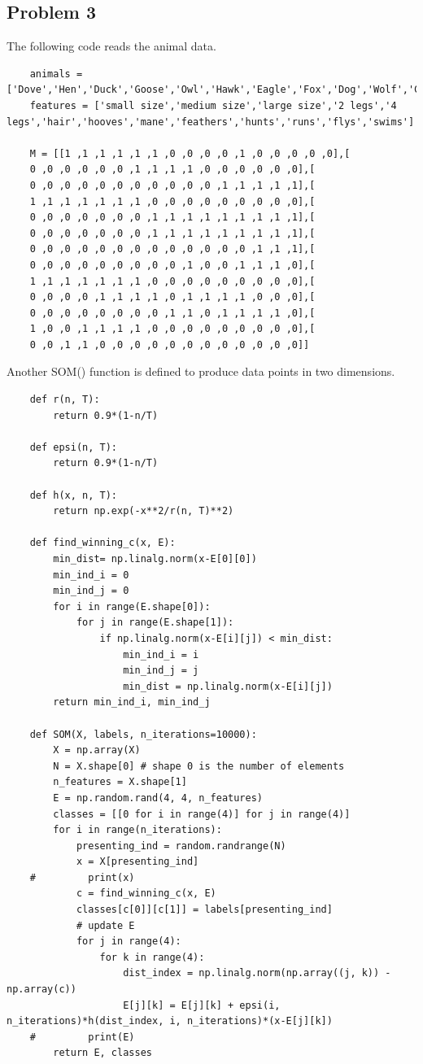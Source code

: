 \documentclass{article}
\begin{document}
\subsection*{Problem 3}
The following code reads the animal data. 
\begin{lstlisting}
	animals = ['Dove','Hen','Duck','Goose','Owl','Hawk','Eagle','Fox','Dog','Wolf','Cat','Tiger','Lion','Horse','Zebra','Cow']
	features = ['small size','medium size','large size','2 legs','4 legs','hair','hooves','mane','feathers','hunts','runs','flys','swims']

	M = [[1 ,1 ,1 ,1 ,1 ,1 ,0 ,0 ,0 ,0 ,1 ,0 ,0 ,0 ,0 ,0],[
	0 ,0 ,0 ,0 ,0 ,0 ,1 ,1 ,1 ,1 ,0 ,0 ,0 ,0 ,0 ,0],[
	0 ,0 ,0 ,0 ,0 ,0 ,0 ,0 ,0 ,0 ,0 ,1 ,1 ,1 ,1 ,1],[
	1 ,1 ,1 ,1 ,1 ,1 ,1 ,0 ,0 ,0 ,0 ,0 ,0 ,0 ,0 ,0],[
	0 ,0 ,0 ,0 ,0 ,0 ,0 ,1 ,1 ,1 ,1 ,1 ,1 ,1 ,1 ,1],[
	0 ,0 ,0 ,0 ,0 ,0 ,0 ,1 ,1 ,1 ,1 ,1 ,1 ,1 ,1 ,1],[
	0 ,0 ,0 ,0 ,0 ,0 ,0 ,0 ,0 ,0 ,0 ,0 ,0 ,1 ,1 ,1],[
	0 ,0 ,0 ,0 ,0 ,0 ,0 ,0 ,0 ,1 ,0 ,0 ,1 ,1 ,1 ,0],[
	1 ,1 ,1 ,1 ,1 ,1 ,1 ,0 ,0 ,0 ,0 ,0 ,0 ,0 ,0 ,0],[
	0 ,0 ,0 ,0 ,1 ,1 ,1 ,1 ,0 ,1 ,1 ,1 ,1 ,0 ,0 ,0],[
	0 ,0 ,0 ,0 ,0 ,0 ,0 ,0 ,1 ,1 ,0 ,1 ,1 ,1 ,1 ,0],[
	1 ,0 ,0 ,1 ,1 ,1 ,1 ,0 ,0 ,0 ,0 ,0 ,0 ,0 ,0 ,0],[
	0 ,0 ,1 ,1 ,0 ,0 ,0 ,0 ,0 ,0 ,0 ,0 ,0 ,0 ,0 ,0]]
\end{lstlisting}
Another SOM() function is defined to produce data points in two dimensions. 
\begin{lstlisting}
	def r(n, T):
		return 0.9*(1-n/T)
		
	def epsi(n, T):
		return 0.9*(1-n/T)

	def h(x, n, T):
		return np.exp(-x**2/r(n, T)**2)

	def find_winning_c(x, E):
		min_dist= np.linalg.norm(x-E[0][0])
		min_ind_i = 0
		min_ind_j = 0
		for i in range(E.shape[0]):
			for j in range(E.shape[1]):
				if np.linalg.norm(x-E[i][j]) < min_dist:
					min_ind_i = i
					min_ind_j = j
					min_dist = np.linalg.norm(x-E[i][j])
		return min_ind_i, min_ind_j

	def SOM(X, labels, n_iterations=10000):
		X = np.array(X)
		N = X.shape[0] # shape 0 is the number of elements
		n_features = X.shape[1]
		E = np.random.rand(4, 4, n_features)
		classes = [[0 for i in range(4)] for j in range(4)]
		for i in range(n_iterations):
			presenting_ind = random.randrange(N)
			x = X[presenting_ind]
	#         print(x)
			c = find_winning_c(x, E)
			classes[c[0]][c[1]] = labels[presenting_ind]
			# update E
			for j in range(4):
				for k in range(4):
					dist_index = np.linalg.norm(np.array((j, k)) - np.array(c))
					E[j][k] = E[j][k] + epsi(i, n_iterations)*h(dist_index, i, n_iterations)*(x-E[j][k])
	#         print(E)
		return E, classes
\end{lstlisting}
\end{document}
